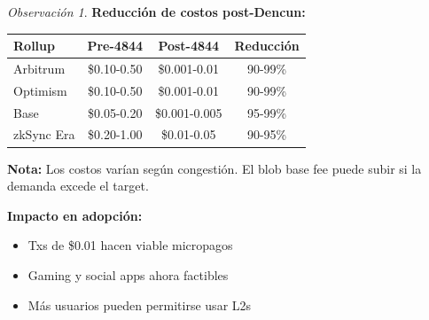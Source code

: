 \documentclass[11pt,a4paper,twoside,openright]{book}
\theoremstyle{definition}
\theoremstyle{plain}
\theoremstyle{remark}
\newtheorem{remark}{Observación}[chapter]
\begin{document}
\begin{remark}
\textbf{Reducción de costos post-Dencun:}

\begin{center}
\begin{tabular}{lccc}
\toprule
\textbf{Rollup} & \textbf{Pre-4844} & \textbf{Post-4844} & \textbf{Reducción} \\
\midrule
Arbitrum & \$0.10-0.50 & \$0.001-0.01 & 90-99\% \\
Optimism & \$0.10-0.50 & \$0.001-0.01 & 90-99\% \\
Base & \$0.05-0.20 & \$0.001-0.005 & 95-99\% \\
zkSync Era & \$0.20-1.00 & \$0.01-0.05 & 90-95\% \\
\bottomrule
\end{tabular}
\end{center}

\textbf{Nota:} Los costos varían según congestión. El blob base fee puede subir si la demanda excede el target.

\textbf{Impacto en adopción:}
\begin{itemize}
    \item Txs de \$0.01 hacen viable micropagos
    \item Gaming y social apps ahora factibles
    \item Más usuarios pueden permitirse usar L2s
\end{itemize}
\end{remark}
\end{document}
